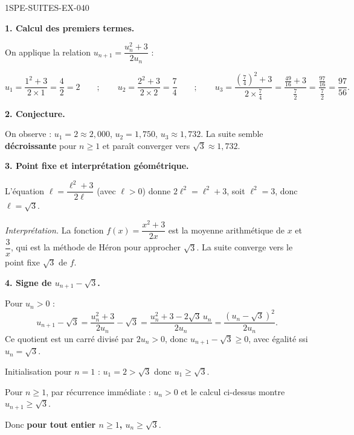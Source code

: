 \begin{corrige}{1SPE-SUITES-EX-040}

\textbf{1. Calcul des premiers termes.}


On applique la relation $u_{n+1} = \dfrac{u_n^2 + 3}{2u_n}$ :

\[
u_1 = \frac{1^2 + 3}{2 \times 1} = \frac{4}{2} = 2 \qquad ; \qquad
u_2 = \frac{2^2 + 3}{2 \times 2} = \frac{7}{4} \qquad ; \qquad
u_3 = \frac{\left(\frac{7}{4}\right)^2 + 3}{2 \times \frac{7}{4}} = \frac{\frac{49}{16} + 3}{\frac{7}{2}} = \frac{\frac{97}{16}}{\frac{7}{2}} = \frac{97}{56}.
\]

\textbf{2. Conjecture.}

On observe : $u_1 = 2 \approx 2{,}000$, $u_2 = 1{,}750$, $u_3 \approx 1{,}732$. La suite semble \textbf{décroissante} pour $n \geq 1$ et paraît converger vers $\sqrt{3} \approx 1{,}732$.

\textbf{3. Point fixe et interprétation géométrique.}


L'équation $\ell = \dfrac{\ell^2 + 3}{2\ell}$ (avec $\ell > 0$) donne $2\ell^2 = \ell^2 + 3$, soit $\ell^2 = 3$, donc $\ell = \sqrt{3}$.

\textit{Interprétation.} La fonction $f(x) = \dfrac{x^2+3}{2x}$ est la moyenne arithmétique de $x$ et $\dfrac{3}{x}$, qui est la méthode de Héron pour approcher $\sqrt{3}$. La suite converge vers le point fixe $\sqrt{3}$ de $f$.

\textbf{4. Signe de $u_{n+1} - \sqrt{3}$.}


Pour $u_n > 0$ :
\[
u_{n+1} - \sqrt{3} = \frac{u_n^2 + 3}{2u_n} - \sqrt{3} = \frac{u_n^2 + 3 - 2\sqrt{3}\,u_n}{2u_n} = \frac{(u_n - \sqrt{3})^2}{2u_n}.
\]
Ce quotient est un carré divisé par $2u_n > 0$, donc $u_{n+1} - \sqrt{3} \geq 0$, avec égalité ssi $u_n = \sqrt{3}$.

\medskip
Initialisation pour $n = 1$ : $u_1 = 2 > \sqrt{3}$ donc $u_1 \geq \sqrt{3}$.

Pour $n \geq 1$, par récurrence immédiate : $u_n > 0$ et le calcul ci-dessus montre $u_{n+1} \geq \sqrt{3}$.

Donc \textbf{pour tout entier $n \geq 1$, $u_n \geq \sqrt{3}$}.


\end{corrige}
